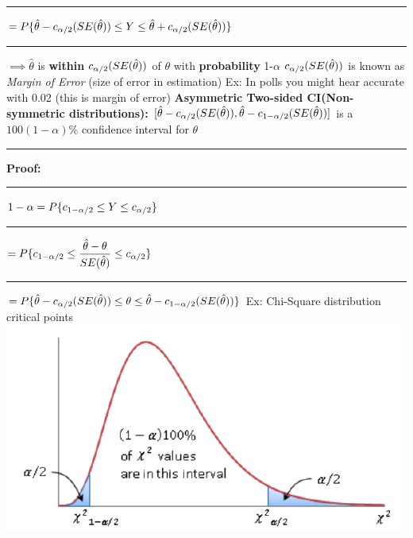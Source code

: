 \documentclass[]{article}
\begin{document}
\newline\Large\rule{4.3cm}{0pt}  $=  P \{ \hat\theta -c_{\alpha \\/ 2} (SE(\hat\theta))  \le Y \le \hat\theta +c_{\alpha \\/ 2}(SE(\hat\theta))  \} $
\newline
\newline\Large\rule{4.3cm}{0pt} $\implies \hat\theta$ is \textbf{within} $c_{\alpha \\/ 2} (SE(\hat\theta))$ of $\theta$ with \textbf{probability}  1-$\alpha$
\newline
\newline $c_{\alpha \\/ 2} (SE(\hat\theta))$ is known as \textit{Margin of Error} (size of error in estimation)
\newline Ex: In polls you might hear accurate with 0.02 (this is margin of error)
\newline
\newline\Large\textbf{Asymmetric Two-sided CI(Non-symmetric distributions):}
\newline $[ \hat\theta - c_{\alpha \\/ 2}(SE(\hat\theta)),  \hat\theta - c_{1- \alpha \\/ 2}(SE(\hat\theta))]$ is a $100(1-\alpha)\%$ confidence interval for $\theta$
\newline 
\newline\Large\rule{3.0cm}{0pt} \textbf{Proof:}
\newline\Large\rule{3.0cm}{0pt}  $ 1 - \alpha =  P \{ c_{1- \alpha \\/ 2} \le Y \le c_{\alpha \\/ 2}  \}$
\newline
\newline\Large\rule{4.3cm}{0pt}  $=  P \{ c_{1- \alpha \\/ 2} \le \dfrac{\hat{\theta} - \theta}{ SE(\hat{\theta})}  \le c_{\alpha \\/ 2}  \}$
\newline
\newline\Large\rule{4.3cm}{0pt}  $=  P \{ \hat\theta - c_{\alpha \\/ 2}(SE(\hat\theta))  \le \theta \le \hat\theta - c_{1- \alpha \\/ 2}(SE(\hat\theta))  \} $
\newline\newline Ex: Chi-Square distribution critical points
\newline\includegraphics[scale=0.6]{assymetric_ci}
\end{document}
